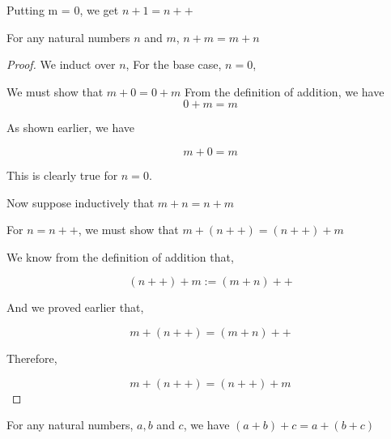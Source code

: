 \documentclass[11pt]{report}
\begin{document}
Putting m = 0, we get \(n+1 = n++\)

\begin{prop}
	For any natural numbers $n$ and $m$, $n+m=m+n$
\end{prop}
\begin{proof}
	We induct over $n$,
	For the base case, $n=0$,

	We must show that $m+0 = 0+m$
	From the definition of addition, we have
	$$0+m = m$$

	As shown earlier, we have

	$$m+0 = m$$

	This is clearly true for $n=0$.

	Now suppose inductively that $m+n = n+m$

	For $n=n++$, we must show that $m+(n++) = (n++) + m$

	We know from the definition of addition that,

	$$(n++) + m := (m+n)++$$

	And we proved earlier that,

	$$m+(n++) = (m+n)++$$

	Therefore,

	$$m+(n++) = (n++)+m$$
\end{proof}
\begin{prop}
	For any natural numbers, $a,b$ and $c$, we have $(a+b)+c = a+(b+c)$
\end{prop}
\end{document}

